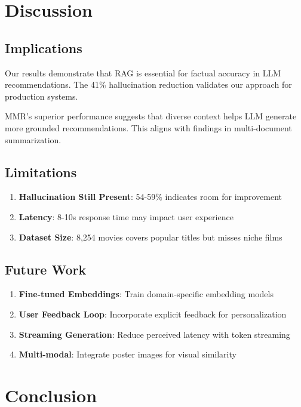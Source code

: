 \documentclass[11pt,a4paper]{article}
\begin{document}
\section{Discussion}

\subsection{Implications}

Our results demonstrate that RAG is essential for factual accuracy in LLM recommendations. The 41\% hallucination reduction validates our approach for production systems.

MMR's superior performance suggests that diverse context helps LLM generate more grounded recommendations. This aligns with findings in multi-document summarization.

\subsection{Limitations}

\begin{enumerate}
    \item \textbf{Hallucination Still Present}: 54-59\% indicates room for improvement
    \item \textbf{Latency}: 8-10s response time may impact user experience
    \item \textbf{Dataset Size}: 8,254 movies covers popular titles but misses niche films
\end{enumerate}

\subsection{Future Work}

\begin{enumerate}
    \item \textbf{Fine-tuned Embeddings}: Train domain-specific embedding models
    \item \textbf{User Feedback Loop}: Incorporate explicit feedback for personalization
    \item \textbf{Streaming Generation}: Reduce perceived latency with token streaming
    \item \textbf{Multi-modal}: Integrate poster images for visual similarity
\end{enumerate}

\section{Conclusion}
\end{document}
